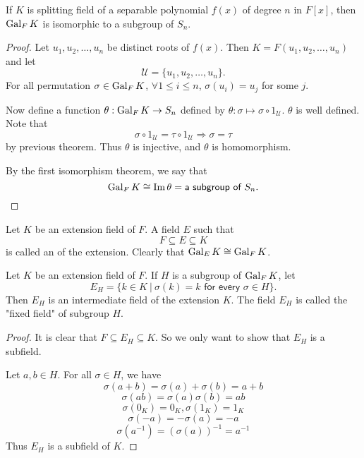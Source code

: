 \begin{corollary}
    If $K$ is splitting field of a separable polynomial $f(x)$ of degree $n$ in $F[x]$, then $\operatorname{Gal}_F K$ is isomorphic 
    to a subgroup of $S_n$.
\end{corollary}
\begin{proof}
    Let $u_1, u_2, \ldots, u_n$ be distinct roots of $f(x)$. Then $K = F(u_1, u_2, \ldots, u_n)$ and let 
    \[\mathcal{U} = \{ u_1, u_2, \ldots, u_n \}.\] For all permutation $\sigma \in \operatorname{Gal}_F K$, $\forall 1 \leq i \leq n$, 
    $\sigma(u_i) = u_j$ for some $j$.

    Now define a function $\theta : \operatorname{Gal}_F K \to S_n$ defined by $\theta: \sigma \mapsto \sigma \circ 1_\mathcal{U}$. $\theta$ 
    is well defined. Note that 
    \[
        \sigma \circ 1_\mathcal{U} = \tau \circ 1_\mathcal{U} \Longrightarrow \sigma = \tau
    \]
    by previous theorem. Thus $\theta$ is injective, and $\theta$ is homomorphism.

    By the first isomorphism theorem, we say that 
    \[
      \operatorname{Gal}_F K \cong \operatorname{Im} \theta = \textsf{a subgroup of } S_n.
    \]
\end{proof}

\begin{definition}
    Let $K$ be an extension field of $F$. A field $E$ such that
    \[
        F \subseteq E \subseteq K
    \]
    is called an  of the extension. Clearly 
    that $\operatorname{Gal}_E K \cong \operatorname{Gal}_F K$.
\end{definition}

\begin{theorem}
    Let $K$ be an extension field of $F$. If $H$ is a subgroup of $\operatorname{Gal}_F K$, let 
    \[
        E_H = \{ k \in K \> | \> \sigma(k)=k \textsf{ for every } \sigma \in H \}.
    \]
    Then $E_H$ is an intermediate field of the extension $K$. The field $E_H$ is called 
    the "fixed field" of subgroup $H$.
\end{theorem}
\begin{proof}
    It is clear that $F \subseteq E_H \subseteq K$. So we only want to show that $E_H$ is a subfield.

    Let $a,b \in H$. For all $\sigma \in H$, we have 
    \[
        \sigma(a + b) = \sigma(a) + \sigma(b) = a+b
    \]
    \[
        \sigma(ab) = \sigma(a) \sigma(b) = ab
    \]
    \[
        \sigma(0_K) = 0_K, \sigma(1_K) = 1_K
    \]
    \[
        \sigma(-a) = - \sigma(a) = -a
    \]
    \[
        \sigma(a^{-1}) =\left( \sigma(a)\right)^{-1} = a^{-1}
    \]
    Thus $E_H$ is a subfield of $K$.
\end{proof}

